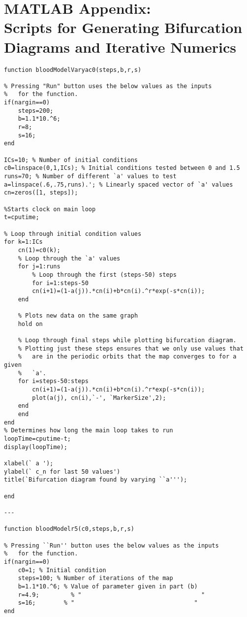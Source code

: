 \pagebreak{} %
\section*{MATLAB Appendix: \\ Scripts for Generating Bifurcation Diagrams and Iterative Numerics}

\begin{verbatim}
function bloodModelVaryac0(steps,b,r,s)

% Pressing "Run" button uses the below values as the inputs
%   for the function.
if(nargin==0)
    steps=200;
    b=1.1*10.^6;
    r=8;
    s=16;
end

ICs=10; % Number of initial conditions
c0=linspace(0,1,ICs); % Initial conditions tested between 0 and 1.5
runs=70; % Number of different `a' values to test
a=linspace(.6,.75,runs).'; % Linearly spaced vector of `a' values
cn=zeros([1, steps]); 

%Starts clock on main loop
t=cputime;

% Loop through initial condition values
for k=1:ICs
    cn(1)=c0(k);    
    % Loop through the `a' values
    for j=1:runs    
        % Loop through the first (steps-50) steps
        for i=1:steps-50
        cn(i+1)=(1-a(j)).*cn(i)+b*cn(i).^r*exp(-s*cn(i));
    end
    
    % Plots new data on the same graph
    hold on
    
    % Loop through final steps while plotting bifurcation diagram.
    % Plotting just these steps ensures that we only use values that 
    %   are in the periodic orbits that the map converges to for a given
    %   `a'.
    for i=steps-50:steps
        cn(i+1)=(1-a(j)).*cn(i)+b*cn(i).^r*exp(-s*cn(i));
        plot(a(j), cn(i),`-', `MarkerSize',2);
    end
    end
end
% Determines how long the main loop takes to run
loopTime=cputime-t;
display(loopTime);

xlabel(` a ');
ylabel(` c_n for last 50 values')
title(`Bifurcation diagram found by varying ``a''');

end

---

function bloodModelr5(c0,steps,b,r,s)

% Pressing ``Run'' button uses the below values as the inputs
%   for the function.
if(nargin==0)
    c0=1; % Initial condition
    steps=100; % Number of iterations of the map
    b=1.1*10.^6; % Value of parameter given in part (b)
    r=4.9;         % "                                  "
    s=16;        % "                                  "
end


\end{verbatim}
